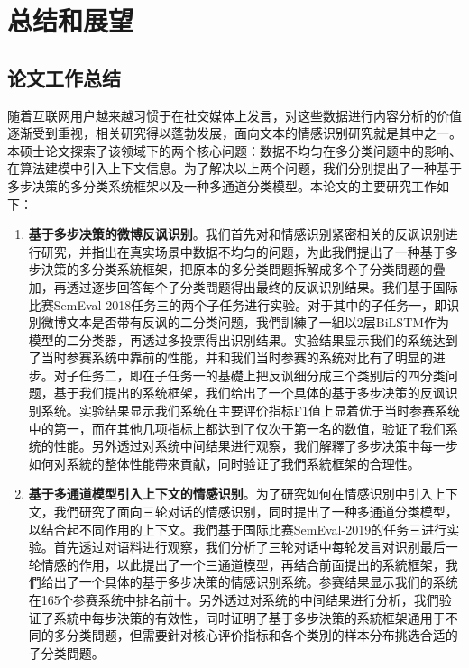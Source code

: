 \chapter{总结和展望}
\label{cha:conclusion}

\section{论文工作总结}

随着互联网用户越来越习惯于在社交媒体上发言，对这些数据进行内容分析的价值逐渐受到重视，相关研究得以蓬勃发展，面向文本的情感识别研究就是其中之一。本硕士论文探索了该领域下的两个核心问题：数据不均匀在多分类问题中的影响、在算法建模中引入上下文信息。为了解决以上两个问题，我们分别提出了一种基于多步决策的多分类系统框架以及一种多通道分类模型。本论文的主要研究工作如下：

\begin{enumerate}

\item {\bf 基于多步决策的微博反讽识别}。我们首先对和情感识别紧密相关的反讽识别进行研究，并指出在真实场景中数据不均匀的问题，为此我們提出了一种基于多步決策的多分类系統框架，把原本的多分类問题拆解成多个子分类問题的疊加，再透过逐步回答每个子分类問题得出最终的反讽识別结果。我们基于国际比赛SemEval-2018任务三的两个子任务进行实验。对于其中的子任务一，即识別微博文本是否带有反讽的二分类问题，我們訓練了一組以2层BiLSTM作为模型的二分类器，再透过多投票得出识別结果。实验结果显示我们的系统达到了当时参赛系统中靠前的性能，并和我们当时参赛的系统对比有了明显的进步。对子任务二，即在子任务一的基礎上把反讽细分成三个类别后的四分类问题，基于我们提出的系统框架，我们给出了一个具体的基于多步决策的反讽识别系统。实验结果显示我们系统在主要评价指标F1值上显着优于当时参赛系统中的第一，而在其他几项指标上都达到了仅次于第一名的数值，验证了我们系统的性能。另外透过对系统中间结果进行观察，我们解釋了多步决策中每一步如何对系統的整体性能帶來貢献，同时验证了我們系統框架的合理性。

\item {\bf 基于多通道模型引入上下文的情感识别}。为了研究如何在情感识別中引入上下文，我們研究了面向三轮对话的情感识别，同时提出了一种多通道分类模型，以结合起不同作用的上下文。我們基于国际比赛SemEval-2019的任务三进行实验。首先透过对语料进行观察，我们分析了三轮对话中每轮发言对识别最后一轮情感的作用，以此提出了一个三通道模型，再结合前面提出的系統框架，我們给出了一个具体的基于多步决策的情感识别系统。参赛结果显示我们的系统在165个参赛系统中排名前十。另外透过对系统的中间结果进行分析，我們验证了系統中每步決策的有效性，同时证明了基于多步決策的系統框架通用于不同的多分类問题，但需要針对核心评价指标和各个类別的样本分布挑选合适的子分类問题。

\end{enumerate}

